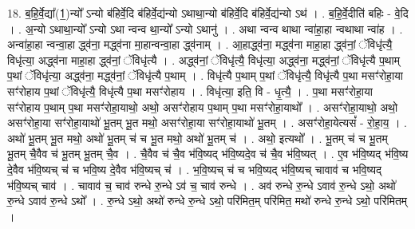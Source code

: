 \documentclass[17pt]{extarticle}
\begin{document}
18. ब॒हि॒र्वे॒द्या᳚(1॒)न्यो᳚ ऽन्यो ब॑हिर्वे॒दि ब॑हिर्वे॒द्य॑न्यो ऽथाथा॒न्यो ब॑हिर्वे॒दि ब॑हिर्वे॒द्य॑न्यो ऽथ॑ । . ब॒हि॒र्वे॒दीति॑ बहिः - वे॒दि । . अ॒न्यो ऽथाथा॒न्यो᳚ ऽन्यो ऽथा न्वन्व था॒न्यो᳚ ऽन्यो ऽथानु॑ । . अथा न्वन्व थाथा न्वा॑हा॒हा न्वथाथा न्वा॑ह । . अन्वा॑हा॒हा न्वन्वा॒हा द्ध्व॑ना॒ मद्ध्व॑ना मा॒हान्वन्वा॒हा द्ध्व॑नाम् । . आ॒हाद्ध्व॑ना॒ मद्ध्व॑ना माहा॒हा द्ध्व॑नां॒ ॅविधृ॑त्यै॒ विधृ॑त्या॒ अद्ध्व॑ना माहा॒हा द्ध्व॑नां॒ ॅविधृ॑त्यै । . अद्ध्व॑नां॒ ॅविधृ॑त्यै॒ विधृ॑त्या॒ अद्ध्व॑ना॒ मद्ध्व॑नां॒ ॅविधृ॑त्यै प॒थाम् प॒थां ॅविधृ॑त्या॒ अद्ध्व॑ना॒ मद्ध्व॑नां॒ ॅविधृ॑त्यै प॒थाम् । . विधृ॑त्यै प॒थाम् प॒थां ॅविधृ॑त्यै॒ विधृ॑त्यै प॒था मसꣳ॑रोहा॒या सꣳ॑रोहाय प॒थां ॅविधृ॑त्यै॒ विधृ॑त्यै प॒था मसꣳ॑रोहाय । . विधृ॑त्या॒ इति॒ वि - धृ॒त्यै॒ । . प॒था मसꣳ॑रोहा॒या सꣳ॑रोहाय प॒थाम् प॒था मसꣳ॑रोहा॒याथो॒ अथो॒ असꣳ॑रोहाय प॒थाम् प॒था मसꣳ॑रोहा॒याथो᳚ । . असꣳ॑रोहा॒याथो॒ अथो॒ असꣳ॑रोहा॒या सꣳ॑रोहा॒याथो॑ भू॒तम् भू॒त मथो॒ असꣳ॑रोहा॒या सꣳ॑रोहा॒याथो॑ भू॒तम् । . असꣳ॑रोहा॒येत्यसं᳚ - रो॒हा॒य॒ । . अथो॑ भू॒तम् भू॒त मथो॒ अथो॑ भू॒तम् च॑ च भू॒त मथो॒ अथो॑ भू॒तम् च॑ । . अथो॒ इत्यथो᳚ । . भू॒तम् च॑ च भू॒तम् भू॒तम् चै॒वैव च॑ भू॒तम् भू॒तम् चै॒व । . चै॒वैव च॑ चै॒व भ॑वि॒ष्यद् भ॑वि॒ष्यदे॒व च॑ चै॒व भ॑वि॒ष्यत् । . ए॒व भ॑वि॒ष्यद् भ॑वि॒ष्य दे॒वैव भ॑वि॒ष्यच् च॑ च भवि॒ष्य दे॒वैव भ॑वि॒ष्यच् च॑ । . भ॒वि॒ष्यच् च॑ च भवि॒ष्यद् भ॑वि॒ष्यच् चावाव॑ च भवि॒ष्यद् भ॑वि॒ष्यच् चाव॑ । . चावाव॑ च॒ चाव॑ रुन्धे रु॒न्धे ऽव॑ च॒ चाव॑ रुन्धे । . अव॑ रुन्धे रु॒न्धे ऽवाव॑ रु॒न्धे ऽथो॒ अथो॑ रु॒न्धे ऽवाव॑ रु॒न्धे ऽथो᳚ । . रु॒न्धे ऽथो॒ अथो॑ रुन्धे रु॒न्धे ऽथो॒ परि॑मित॒म् परि॑मित॒ मथो॑ रुन्धे रु॒न्धे ऽथो॒ परि॑मितम् । \newline
\end{document}
